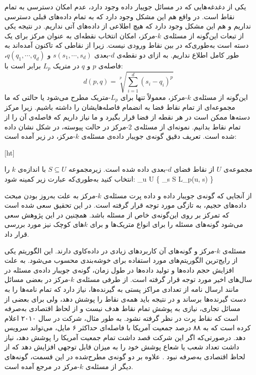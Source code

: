 یکی از دغدغه‌هایی که در مسائل جویبار داده وجود دارد، عدم امکان دسترسی به تمام نقاط است.
در واقع هم این مشکل وجود دارد که به تمام داده‌های قبلی دسترسی نداریم و هم این مشکل وجود دارد که هیچ اطلاعی از داده‌های آتی نداریم.
در نتیجه یکی از تبعات این‌گونه از مسئله‌ی $k$-مرکز، امکان انتخاب نقطه‌ای به عنوان مرکز برای یک دسته است به‌طوری‌که در بین نقاط ورودی نیست.
زیرا از نقاطی که تاکنون آمده‌اند به طور کامل اطلاع نداریم.
به ازای دو نقطه‌ی $d$-بعدی $s(s_1, \cdots, s_d)$ و $q(q_1, \cdots, q_d)$، فاصله‌ی $p$ و $q$ در متریک $L_p$ برابر است با:
$$d(p, q) = \sqrt[p]{\sum_{i=1}^{d} (s_i - q_i) ^ p}$$
این‌گونه از مسئله‌ی $k$-مرکز، معمولاً تنها برای $L_p$-متریک مطرح می‌شود یا حالتی که ما مجموعه‌ای از تمام نقاط فضا به انضمام فاصله‌هایشان را داشته باشیم.
زیرا مرکز دسته‌ها ممکن است در هر نقطه از فضا قرار بگیرد و ما نیاز داریم که فاصله‌ی آن را از تمام نقاط بدانیم.
نمونه‌ای از مسئله‌ی $2$-مرکز در حالت پیوسته، در شکل  نشان داده شده است.
تعریف دقیق گونه‌ی جویبار داده‌ی مسئله‌ی $k$‌-مرکز، در زیر آمده است:

[ht]

 مجموعه‌ی $U$ از نقاط فضای $d$-بعدی داده شده است.
زیرمجموعه $S \subseteq U$ با اندازه‌ی $k$ را انتخاب کنید به‌طوری‌که عبارت زیر کمینه شود:
\max_{u \in U} \{ \min_{s \in S} L_p(u, s) \}

از آنجایی که گونه‌ی جویبار داده و داده پرت مسئله‌ی $k$-مرکز به علت به‌روز بودن مبحث داده‌های حجیم، به تازگی مورد توجه قرار گرفته است.
در این تحقیق سعی شده است که تمرکز بر روی این‌گونه‌ی خاص از مسئله باشد.
همچنین در این پژوهش سعی می‌شود گونه‌های مسئله را برای انواع متریک‌ها و برای $k$های کوچک نیز مورد بررسی قرار داد. 


مسئله‌ی $k$-مرکز و گونه‌های آن کاربردهای زیادی در داده‌کاوی دارند.
این الگوریتم یکی از رایج‌ترین الگوریتم‌های مورد استفاده برای خوشه‌بندی محسوب می‌شود.
به علت افزایش حجم داده‌ها و تولید داده‌ها در طول زمان، گونه‌ی جویبار داده‌ی مسئله در سال‌های اخیر مورد توجه قرار گرفته است.
از طرفی مسئله‌ی $k$-مرکز در بعضی مسائل مانند ارسال نامه از تعدادی مراکز پستی به گیرنده‌ها، نیاز دارد که تمام نامه‌ها را به دست گیرنده‌ها برساند و در نتیجه باید همه‌ی نقاط را پوشش دهد، ولی برای بعضی از مسائل تجاری، نیازی به پوشش تمام نقاط هدف نیست و از لحاظ اقتصادی به‌صرفه است که نقاط پرت در نظر گرفته نشود.
به طور مثال، شرکت  در سال ۲۰۱۰ اعلام کرده است که به ۸۸ درصد جمعیت آمریکا با فاصله‌ای حداکثر ۶ مایل، می‌تواند سرویس دهد.
درصورتی‌که اگر این شرکت قصد داشت تمام جمعیت آمریکا را پوشش دهد، نیاز داشت تعداد شعب یا شعاع پوشش خود را به میزان قابل توجهی افزایش دهد که از لحاظ اقتصادی به‌صرفه نبود .
علاوه بر دو گونه‌ی مطرح‌شده در این قسمت، گونه‌های دیگر از مسئله‌ی $k$-مرکز در مرجع  آمده است.


